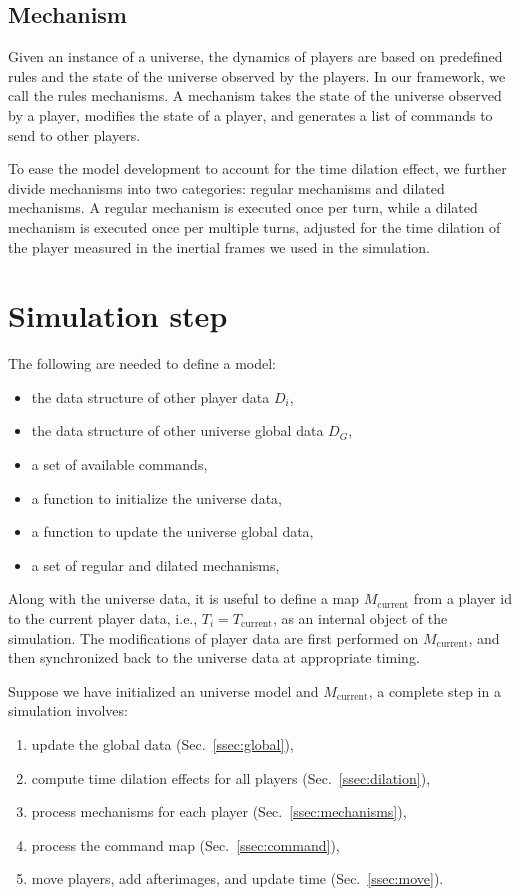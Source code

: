 \documentclass{svproc}
\begin{document}
\subsection{Mechanism} \label{ssec:mechanism}

Given an instance of a universe, 
the dynamics of players are based on predefined rules and the state of the universe observed by the players.
In our framework, we call the rules mechanisms.
A mechanism takes the state of the universe observed by a player,
modifies the state of a player,
and generates a list of commands to send to other players.

To ease the model development to account for the time dilation effect, 
we further divide mechanisms into two categories: regular mechanisms and dilated mechanisms. 
A regular mechanism is executed once per turn, 
while a dilated mechanism is executed once per multiple turns, 
adjusted for the time dilation of the player measured in the inertial frames we used in the simulation.

\section{Simulation step} \label{sec:simulation}

The following are needed to define a model:
\begin{itemize}
  \item the data structure of other player data $D_i$,
  \item the data structure of other universe global data $D_G$,
  \item a set of available commands,
  \item a function to initialize the universe data,
  \item a function to update the universe global data,
  \item a set of regular and dilated mechanisms,
\end{itemize}

Along with the universe data,
it is useful to define a map $M_{\textrm{current}}$ from a player id to the current player data, 
i.e., $T_i = T_{\textrm{current}}$,
as an internal object of the simulation.
The modifications of player data are first performed on $M_\textrm{current}$, 
and then synchronized back to the universe data at appropriate timing.

Suppose we have initialized an universe model and $M_\textrm{current}$, a complete step in a simulation involves:
\begin{enumerate}
  \item update the global data (Sec.~\ref{ssec:global}),
  \item compute time dilation effects for all players (Sec.~\ref{ssec:dilation}),
  \item process mechanisms for each player (Sec.~\ref{ssec:mechanisms}),
  \item process the command map (Sec.~\ref{ssec:command}),
  \item move players, add afterimages, and update time (Sec.~\ref{ssec:move}).
\end{enumerate}
\end{document}
